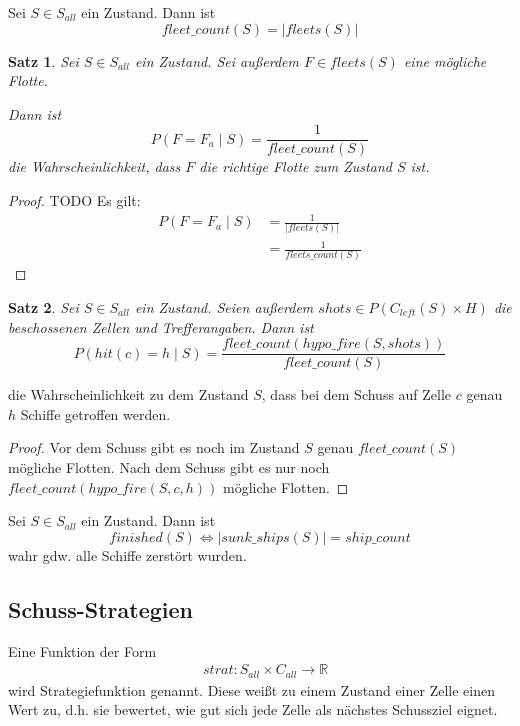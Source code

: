 \documentclass[a4paper,12pt]{llncs}
\numberwithin{equation}{section}
\newtheorem{satz}{Satz}
\begin{document}
\begin{definition}
Sei $S\in S_{all}$ ein Zustand.
Dann ist
\[
fleet\_count(S)=|fleets(S)|
\]
\end{definition}


\begin{satz}
Sei $S\in S_{all}$ ein Zustand.
Sei außerdem $F \in fleets(S)$ eine mögliche Flotte.

Dann ist
\[
P(F = F_a \mid S)=\frac{1}{fleet\_count(S)}
\]
die Wahrscheinlichkeit, dass $F$ die richtige Flotte zum Zustand $S$ ist.
\end{satz}

\begin{proof}
TODO
Es gilt:
\begin{align}
P(F=F_a\mid S)&= \frac{1}{\left|fleets(S)\right|} \nonumber\\
 &= \frac{1}{fleets\_count(S)}\nonumber
\end{align}
\end{proof}


\begin{satz}
Sei $S\in S_{all}$ ein Zustand.
Seien außerdem $shots \in P(C_{left}(S) \times H)$ die beschossenen Zellen und Trefferangaben.
Dann ist
\[
P(hit(c)=h \mid S)=\frac{fleet\_count(hypo\_fire(S, shots))}{fleet\_count(S)}
\]
\end{satz}
die Wahrscheinlichkeit zu dem Zustand $S$, dass bei dem Schuss auf Zelle $c$ genau $h$ Schiffe getroffen werden.

\begin{proof}
Vor dem Schuss gibt es noch im Zustand $S$ genau $fleet\_count(S)$ mögliche Flotten.
Nach dem Schuss gibt es nur noch \\$fleet\_count(hypo\_fire(S,c, h))$ mögliche Flotten.
\end{proof}

\begin{definition}
Sei $S\in S_{all}$ ein Zustand.
Dann ist
\[
finished(S) \Leftrightarrow |sunk\_ships(S)|=ship\_count
\]
wahr gdw. alle Schiffe zerstört wurden.
\end{definition}

\subsection{Schuss-Strategien}

\begin{definition}
Eine Funktion der Form
\begin{align}
&strat:S_{all} \times C_{all} \rightarrow \mathbb{R} \nonumber
\end{align}
wird Strategiefunktion genannt. Diese weißt zu einem Zustand einer Zelle einen Wert zu, d.h. sie bewertet, wie gut sich jede Zelle als nächstes Schussziel eignet.
\end{definition}
\end{document}
